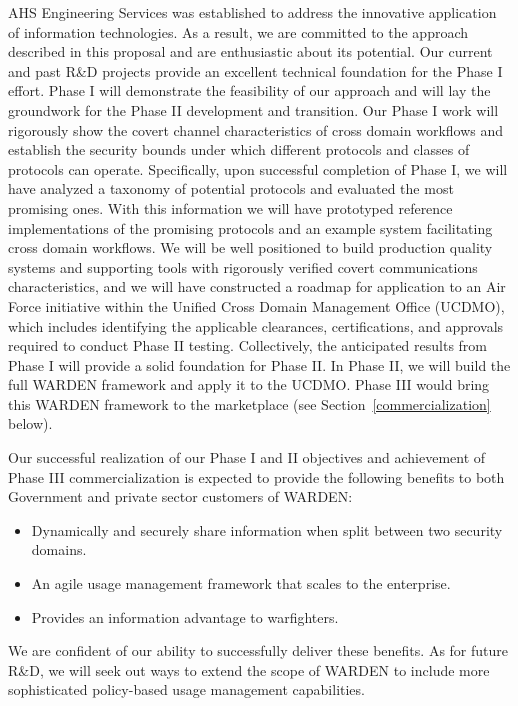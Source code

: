 \documentclass{sbir}
\begin{document}
AHS Engineering Services was established to address the innovative application of information technologies. As a result, we are committed to the approach described in this proposal and are enthusiastic about its potential. Our current and past R\&D projects provide an excellent technical foundation for the Phase I effort. Phase I will demonstrate the feasibility of our approach and will lay the groundwork for the Phase II development and transition. Our Phase I work will rigorously show the covert channel characteristics of cross domain workflows and establish the security bounds under which different protocols and classes of protocols can operate. Specifically, upon successful completion of Phase I, we will have analyzed a taxonomy of potential protocols and evaluated the most promising ones. With this information we will have prototyped reference implementations of the promising protocols and an example system facilitating cross domain workflows. We will be well positioned to build production quality systems and supporting tools with rigorously verified covert communications characteristics, and we will have constructed a roadmap for application to an Air Force initiative within the Unified Cross Domain Management Office (UCDMO), which includes identifying the applicable clearances, certifications, and approvals required to conduct Phase II testing. Collectively, the anticipated results from Phase I will provide a solid foundation for Phase II. In Phase II, we will build the full WARDEN framework and apply it to the UCDMO. Phase III would bring this WARDEN framework to the marketplace (see Section~\ref{commercialization} below).

Our successful realization of our Phase I and II objectives and achievement of Phase III commercialization is expected to provide the following benefits to both Government and private sector customers of WARDEN:
\vspace{-0.1in}
\begin{itemize}
     \item Dynamically and securely share information when split between two security domains.
     \item An agile usage management framework that scales to the enterprise.
     \item Provides an information advantage to warfighters.
\end{itemize}

We are confident of our ability to successfully deliver these benefits. As for future R\&D, we will seek out ways to extend the scope of WARDEN to include more sophisticated policy-based usage management capabilities.
\end{document}
